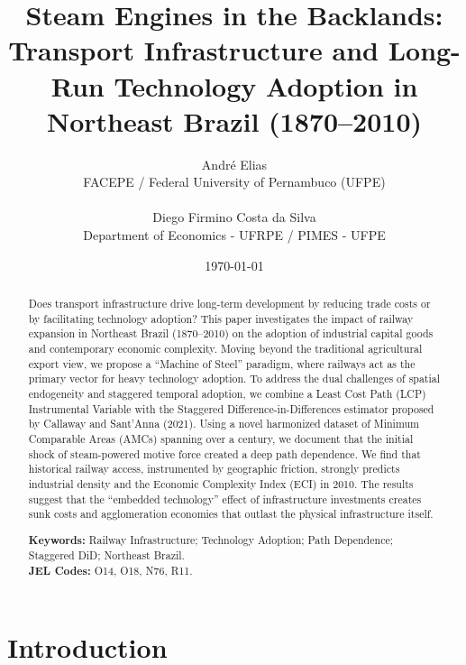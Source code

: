 \documentclass[11pt, a4paper]{article}
\title{\textbf{Steam Engines in the Backlands: \\ Transport Infrastructure and Long-Run Technology Adoption in Northeast Brazil (1870--2010)}}
\author{
André Elias \\ {\small FACEPE / Federal University of Pernambuco (UFPE)} \\
\vspace{0.5cm}
\\
Diego Firmino Costa da Silva \\ {\small Department of Economics - UFRPE / PIMES - UFPE}
}
\date{\today}
\begin{document}
\maketitle

\begin{abstract}
    \noindent Does transport infrastructure drive long-term development by reducing trade costs or by facilitating technology adoption? This paper investigates the impact of railway expansion in Northeast Brazil (1870--2010) on the adoption of industrial capital goods and contemporary economic complexity. Moving beyond the traditional agricultural export view, we propose a ``Machine of Steel'' paradigm, where railways act as the primary vector for heavy technology adoption. To address the dual challenges of spatial endogeneity and staggered temporal adoption, we combine a Least Cost Path (LCP) Instrumental Variable with the Staggered Difference-in-Differences estimator proposed by Callaway and Sant'Anna (2021). Using a novel harmonized dataset of Minimum Comparable Areas (AMCs) spanning over a century, we document that the initial shock of steam-powered motive force created a deep path dependence. We find that historical railway access, instrumented by geographic friction, strongly predicts industrial density and the Economic Complexity Index (ECI) in 2010. The results suggest that the ``embedded technology'' effect of infrastructure investments creates sunk costs and agglomeration economies that outlast the physical infrastructure itself.
    
    \vspace{0.5cm}
    \noindent \textbf{Keywords:} Railway Infrastructure; Technology Adoption; Path Dependence; Staggered DiD; Northeast Brazil. \\
    \noindent \textbf{JEL Codes:} O14, O18, N76, R11.
\end{abstract}

\newpage
\onehalfspacing

\section{Introduction}
\end{document}

